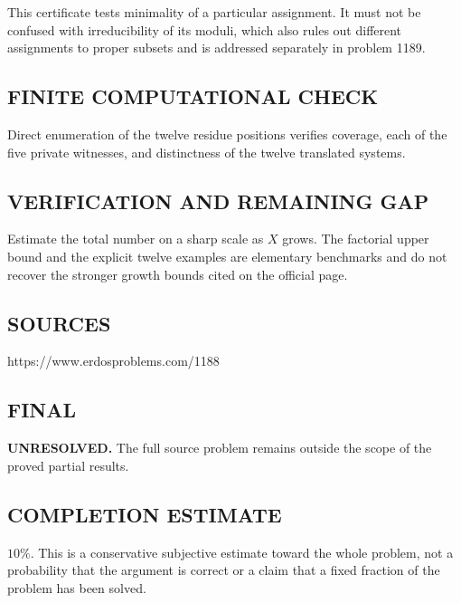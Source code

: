 This certificate tests minimality of a particular assignment. It must not be
confused with irreducibility of its moduli, which also rules out different
assignments to proper subsets and is addressed separately in problem 1189.

\subsection*{FINITE COMPUTATIONAL CHECK}
Direct enumeration of the twelve residue positions verifies coverage, each of the five private witnesses, and distinctness of the twelve translated systems.

\subsection*{VERIFICATION AND REMAINING GAP}
Estimate the total number on a sharp scale as $X$ grows. The factorial
upper bound and the explicit twelve examples are elementary benchmarks and
do not recover the stronger growth bounds cited on the official page.

\subsection*{SOURCES}
https://www.erdosproblems.com/1188

\subsection*{FINAL}
\textbf{UNRESOLVED.} The full source problem remains outside the scope of the proved partial results.

\subsection*{COMPLETION ESTIMATE}
$10\%$. This is a conservative subjective estimate toward the whole problem, not a probability that the argument is correct or a claim that a fixed fraction of the problem has been solved.
